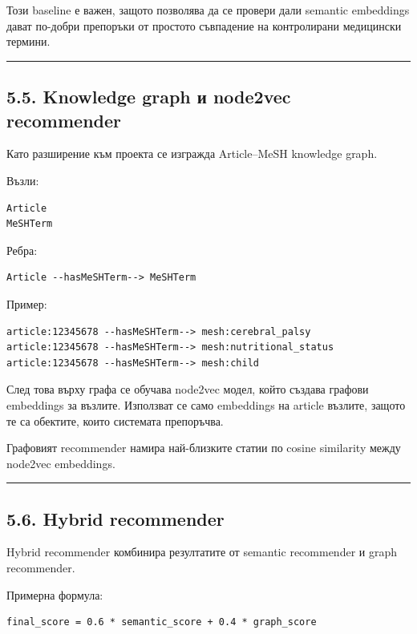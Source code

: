 \documentclass[12pt,a4paper]{article}
\begin{document}
Този baseline е важен, защото позволява да се провери дали semantic embeddings дават по-добри препоръки от простото съвпадение на контролирани медицински термини.

\vspace{0.5em}\hrule\vspace{1.0em}

\subsection{5.5. Knowledge graph и node2vec recommender}\label{knowledge-graph-ux438-node2vec-recommender}

Като разширение към проекта се изгражда Article--MeSH knowledge graph.

Възли:

\begin{verbatim}
Article
MeSHTerm
\end{verbatim}

Ребра:

\begin{verbatim}
Article --hasMeSHTerm--> MeSHTerm
\end{verbatim}

Пример:

\begin{verbatim}
article:12345678 --hasMeSHTerm--> mesh:cerebral_palsy
article:12345678 --hasMeSHTerm--> mesh:nutritional_status
article:12345678 --hasMeSHTerm--> mesh:child
\end{verbatim}

След това върху графа се обучава node2vec модел, който създава графови embeddings за възлите. Използват се само embeddings на article възлите, защото те са обектите, които системата препоръчва.

Графовият recommender намира най-близките статии по cosine similarity между node2vec embeddings.

\vspace{0.5em}\hrule\vspace{1.0em}

\subsection{5.6. Hybrid recommender}\label{hybrid-recommender}

Hybrid recommender комбинира резултатите от semantic recommender и graph recommender.

Примерна формула:

\begin{verbatim}
final_score = 0.6 * semantic_score + 0.4 * graph_score
\end{verbatim}
\end{document}
